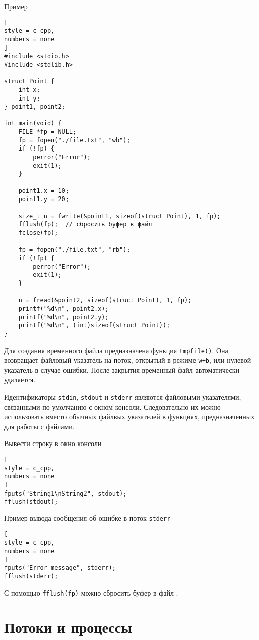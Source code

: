 \documentclass[%
	11pt,
	a4paper,
	utf8,
		]{article}
\begin{document}
Пример
\begin{lstlisting}[
style = c_cpp,
numbers = none
]
#include <stdio.h>
#include <stdlib.h>

struct Point {
    int x;
    int y;
} point1, point2;

int main(void) {
    FILE *fp = NULL;
    fp = fopen("./file.txt", "wb");
    if (!fp) {
        perror("Error");
        exit(1);
    }
    
    point1.x = 10;
    point1.y = 20;
    
    size_t n = fwrite(&point1, sizeof(struct Point), 1, fp);
    fflush(fp);  // сбросить буфер в файл
    fclose(fp);
    
    fp = fopen("./file.txt", "rb");
    if (!fp) {
        perror("Error");
        exit(1);
    }
    
    n = fread(&point2, sizeof(struct Point), 1, fp);
    printf("%d\n", point2.x);
    printf("%d\n", point2.y);
    printf("%d\n", (int)sizeof(struct Point));
}
\end{lstlisting}

Для создания временного файла предназначена функция \verb|tmpfile()|. Она возвращает файловый указатель на поток, открытый в режиме \verb|w+b|, или нулевой указатель в случае ошибки. После закрытия временный файл автоматически удаляется.

Идентификаторы \verb|stdin|, \verb|stdout| и \verb|stderr| являются файловыми указателями, связанными по умолчанию с окном консоли. Следовательно их можно использовать вместо обычных файлвых указателей в функциях, предназначенных для работы с файлами.

Вывести строку в окно консоли
\begin{lstlisting}[
style = c_cpp,
numbers = none
]
fputs("String1\nString2", stdout);
fflush(stdout);
\end{lstlisting}

Пример вывода сообщения об ошибке в поток \verb|stderr|
\begin{lstlisting}[
style = c_cpp,
numbers = none
]
fputs("Error message", stderr);
fflush(stderr);
\end{lstlisting}

С помощью \verb|fflush(fp)| можно сбросить буфер в файл \cite[]{prokhorenok-prog-c:2020}.

\section{Потоки и процессы}
\end{document}
